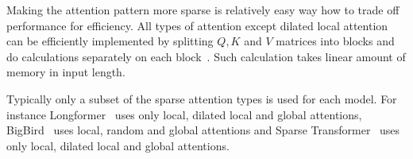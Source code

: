 Making the attention pattern more sparse is relatively easy way how to trade off
performance for efficiency. All types of attention except dilated local
attention can be efficiently implemented by splitting $Q, K$ and $V$ matrices
into blocks and do calculations separately on each block~\cite{zaheer2020big}.
Such calculation takes linear amount of memory in input length.

Typically only a subset of the sparse attention types is used for each model.
For instance Longformer~\cite{beltagy2020longformer} uses only local, dilated
local and global attentions, BigBird~\cite{zaheer2020big} uses local, random and
global attentions and Sparse Transformer~\cite{child2019generating} uses only
local, dilated local and global attentions.

\begin{figure}
\centering


\end{figure}
